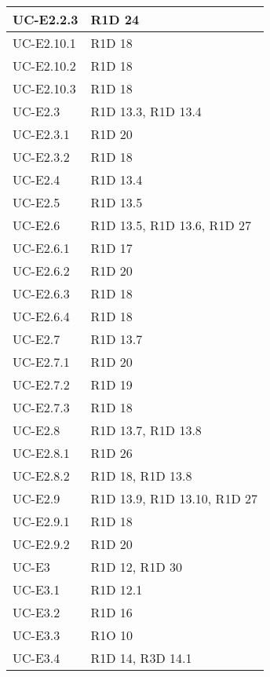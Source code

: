 \begin{center}
\begin{longtable}{ |  p{5cm} | p{5cm} |}
    UC-E2.2.3 & R1D 24 \\ \hline
    UC-E2.10.1 & R1D 18 \\ \hline
    UC-E2.10.2 & R1D 18 \\ \hline
    UC-E2.10.3 & R1D 18 \\ \hline
    UC-E2.3 & R1D 13.3, R1D 13.4 \\ \hline
    UC-E2.3.1 & R1D 20 \\ \hline
    UC-E2.3.2 & R1D 18 \\ \hline
    UC-E2.4 & R1D 13.4 \\ \hline
    UC-E2.5 & R1D 13.5 \\ \hline
    UC-E2.6 & R1D 13.5, R1D 13.6, R1D 27 \\ \hline
    UC-E2.6.1 & R1D 17 \\ \hline
    UC-E2.6.2 & R1D 20 \\ \hline
    UC-E2.6.3 & R1D 18 \\ \hline
    UC-E2.6.4 & R1D 18 \\ \hline
    UC-E2.7 & R1D 13.7 \\ \hline
    UC-E2.7.1 & R1D 20 \\ \hline
    UC-E2.7.2 & R1D 19 \\ \hline
    UC-E2.7.3 & R1D 18 \\ \hline
    UC-E2.8 & R1D 13.7, R1D 13.8 \\ \hline
    UC-E2.8.1 & R1D 26 \\ \hline
    UC-E2.8.2 & R1D 18, R1D 13.8 \\ \hline
    UC-E2.9 & R1D 13.9, R1D 13.10, R1D 27 \\ \hline 
    UC-E2.9.1 & R1D 18 \\ \hline
    UC-E2.9.2 & R1D 20 \\ \hline
    UC-E3 & R1D 12, R1D 30 \\ \hline
    UC-E3.1 & R1D 12.1 \\ \hline
    UC-E3.2 & R1D 16 \\ \hline
    UC-E3.3 & R1O 10 \\ \hline
    UC-E3.4 & R1D 14, R3D 14.1 \\ \hline
    \end{longtable}
  \egroup
\end{center}
